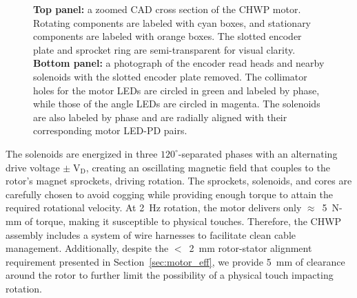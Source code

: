 \begin{figure}[!t]
    \centering
    \caption{\textbf{Top panel:} a zoomed CAD cross section of the CHWP motor. Rotating components are labeled with cyan boxes, and stationary components are labeled with orange boxes. The slotted encoder plate and sprocket ring are semi-transparent for visual clarity. \textbf{Bottom panel:} a photograph of the encoder read heads and nearby solenoids with the slotted encoder plate removed. The collimator holes for the motor LEDs are circled in green and labeled by phase, while those of the angle LEDs are circled in magenta. The solenoids are also labeled by phase and are radially aligned with their corresponding motor LED-PD pairs.}
    \label{fig:motor_mech_assy}
\end{figure}

The solenoids are energized in three $120^{\circ}$-separated phases with an alternating drive voltage $\pm \; \mathrm{V_{D}}$, creating an oscillating magnetic field that couples to the rotor's magnet sprockets, driving rotation. The sprockets, solenoids, and cores are carefully chosen to avoid cogging while providing enough torque to attain the required rotational velocity. At 2~Hz rotation, the motor delivers only $\approx$~5~N-mm of torque, making it susceptible to physical touches. Therefore, the CHWP assembly includes a system of wire harnesses to facilitate clean cable management. Additionally, despite the $<$~2~mm rotor-stator alignment requirement presented in Section~\ref{sec:motor_eff}, we provide 5~mm of clearance around the rotor to further limit the possibility of a physical touch impacting rotation.

